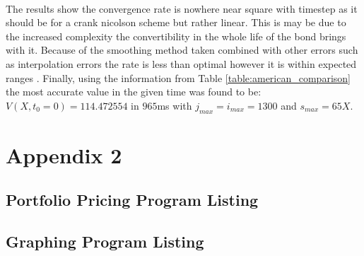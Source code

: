 \documentclass{article}
\begin{document}
\\
\par The results show the convergence rate is nowhere near square with timestep as it should be
for a crank nicolson scheme but rather linear.
This is may be due to the increased complexity the convertibility in the whole life of the
bond brings with it.
Because of the smoothing method taken combined with other errors such as interpolation errors
the rate is less than optimal however it is within expected ranges \cite{li2005pricing}.
Finally, using the information from Table \ref{table:american_comparison} the most accurate value in the given time was found to be:
$V(X,t_0=0)=114.472554$ in $965$ms with $j_{max}=i_{max}=1300$ and $s_{max}=65X$.
\clearpage


\clearpage
\section*{Appendix 2}
\lstset{style=mystyle}
\subsection*{Portfolio Pricing Program Listing}

\subsection*{Graphing Program Listing}


\end{document}
